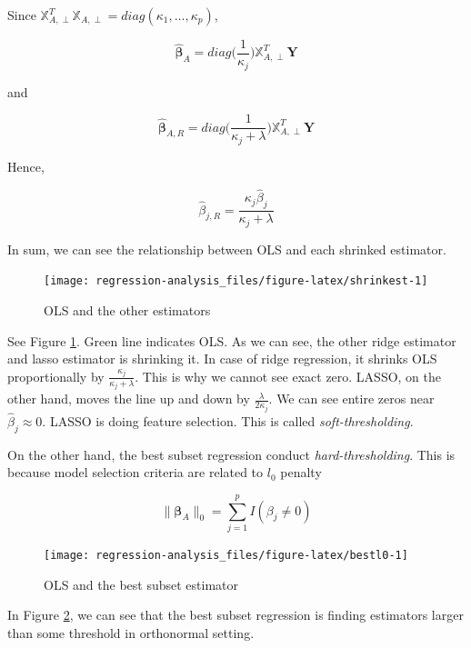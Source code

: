 \documentclass[]{book}
\theoremstyle{definition}
\theoremstyle{definition}
\theoremstyle{definition}
\theoremstyle{remark}
\begin{document}
Since \(\mathbb{X}_{A, \perp}^T \mathbb{X}_{A, \perp} = diag(\kappa_1, \ldots, \kappa_p)\),

\[\boldsymbol{\hat\beta}_{A} = diag \bigg(\frac{1}{\kappa_j} \bigg) \mathbb{X}_{A,\perp}^T \mathbf{Y}\]

and

\[\boldsymbol{\hat\beta}_{A,R} = diag \bigg(\frac{1}{\kappa_j + \lambda} \bigg) \mathbb{X}_{A,\perp}^T \mathbf{Y}\]

Hence,

\[\hat\beta_{j, R} = \frac{\kappa_j \hat\beta_j}{\kappa_j + \lambda}\]

In sum, we can see the relationship between OLS and each shrinked estimator.

\begin{figure}[H]

{\centering \texttt{[image: regression-analysis\_files/figure-latex/shrinkest-1]} 

}

\caption{OLS and the other estimators}\label{fig:shrinkest}
\end{figure}

See Figure \ref{fig:shrinkest}. Green line indicates OLS. As we can see, the other ridge estimator and lasso estimator is shrinking it. In case of ridge regression, it shrinks OLS proportionally by \(\frac{\kappa_j}{\kappa_j + \lambda}\). This is why we cannot see exact zero. LASSO, on the other hand, moves the line up and down by \(\frac{\lambda}{2 \kappa_j}\). We can see entire zeros near \(\hat\beta_j \approx 0\). LASSO is doing feature selection. This is called \emph{soft-thresholding}.

On the other hand, the best subset regression conduct \emph{hard-thresholding}. This is because model selection criteria are related to \(l_0\) penalty

\[\lVert \boldsymbol\beta_A \rVert_0 = \sum_{j = 1}^p I(\beta_j \neq 0)\]

\begin{figure}[H]

{\centering \texttt{[image: regression-analysis\_files/figure-latex/bestl0-1]} 

}

\caption{OLS and the best subset estimator}\label{fig:bestl0}
\end{figure}

In Figure \ref{fig:bestl0}, we can see that the best subset regression is finding estimators larger than some threshold in orthonormal setting.
\end{document}

